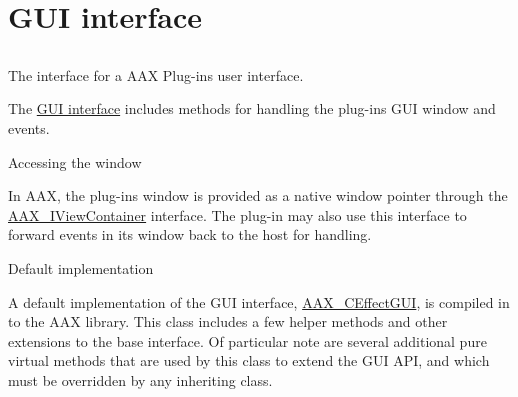 \hypertarget{a00329}{}\section{G\+U\+I interface}
\label{a00329}


\subsection{ }
The interface for a A\+A\+X Plug-\/in\textquotesingle{}s user interface. 

The \hyperlink{a00098}{G\+U\+I interface} includes methods for handling the plug-\/in\textquotesingle{}s G\+U\+I window and events.

\begin{DoxyParagraph}{Accessing the window}

\end{DoxyParagraph}
In A\+A\+X, the plug-\/in\textquotesingle{}s window is provided as a native window pointer through the \hyperlink{a00117}{A\+A\+X\+\_\+\+I\+View\+Container} interface. The plug-\/in may also use this interface to forward events in its window back to the host for handling.

\begin{DoxyParagraph}{Default implementation}

\end{DoxyParagraph}
A default implementation of the G\+U\+I interface, \hyperlink{a00017}{A\+A\+X\+\_\+\+C\+Effect\+G\+U\+I}, is compiled in to the A\+A\+X library. This class includes a few helper methods and other extensions to the base interface. Of particular note are several additional pure virtual methods that are used by this class to extend the G\+U\+I A\+P\+I, and which must be overridden by any inheriting class.

